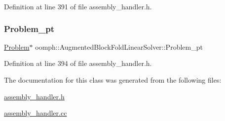 Definition at line 391 of file assembly\+\_\+handler.\+h.

\mbox{\label{classoomph_1_1AugmentedBlockFoldLinearSolver_a65a5a2a87943d506cf4afc5cdbcfc06f}} 
\subsubsection{\texorpdfstring{Problem\+\_\+pt}{Problem\_pt}}
{\footnotesize\ttfamily \hyperlink{classoomph_1_1Problem}{Problem}$\ast$ oomph\+::\+Augmented\+Block\+Fold\+Linear\+Solver\+::\+Problem\+\_\+pt\hspace{0.3cm}{\ttfamily [private]}}



Definition at line 394 of file assembly\+\_\+handler.\+h.



The documentation for this class was generated from the following files\+:\begin{DoxyCompactItemize}
\item 
\hyperlink{assembly__handler_8h}{assembly\+\_\+handler.\+h}\item 
\hyperlink{assembly__handler_8cc}{assembly\+\_\+handler.\+cc}\end{DoxyCompactItemize}
